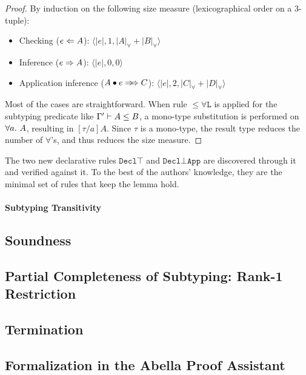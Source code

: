 \begin{proof}
    By induction on the following size measure (lexicographical order on a 3-tuple):
    \begin{itemize}
        \item Checking ($e \Leftarrow A$): $\langle |e|, 1, |A|_\forall + |B|_\forall \rangle$
        \item Inference ($e \Rightarrow A$): $\langle |e|, 0, 0 \rangle$
        \item Application inference ($\appInf{A}{e}{C}$): $\langle |e|, 2, |C|_\forall + |D|_\forall \rangle$
    \end{itemize}
    Most of the cases are straightforward.
    When rule $\mathtt{{\le}\forall L}$ is applied for the subtyping predicate
    like $\Gamma' \vdash A \le B$,
    a mono-type substitution is performed on $\all A$,
    resulting in $[\tau/a]A$.
    Since $\tau$ is a mono-type, the result type reduces the number of $\forall$'s,
    and thus reduces the size measure.
\end{proof}

The two new declarative rules $\mathtt{Decl\top}$ and $\mathtt{Decl{\bot}App}$ are
discovered through it and verified against it.
To the best of the authors' knowledge,
they are the minimal set of rules that keep the lemma hold.


\paragraph{Subtyping Transitivity}




\subsection{Soundness}

\subsection{Partial Completeness of Subtyping: Rank-1 Restriction}

\subsection{Termination}

\subsection{Formalization in the Abella Proof Assistant}

